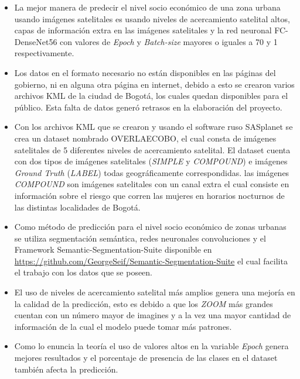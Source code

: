 \begin{itemize}
\item La mejor manera de predecir el nivel socio económico de una zona urbana usando imágenes satelitales es usando niveles de acercamiento satelital altos, capas de información extra en las imágenes satelitales y la red neuronal FC-DenseNet56 con valores de \textit{Epoch} y \textit{Batch-size} mayores o iguales a 70 y 1 respectivamente. 

\item Los datos en el formato necesario no están disponibles en las páginas del gobierno, ni en alguna otra página en internet, debido a esto se crearon varios archivos KML de la ciudad de Bogotá, los cuales quedan disponibles para el público. Esta falta de datos generó retrasos en la elaboración del proyecto. 

\item Con los archivos KML que se crearon y usando el software ruso SASplanet se crea un dataset nombrado OVERLAECOBO, el cual consta de imágenes satelitales de 5 diferentes niveles de acercamiento satelital. El dataset cuenta con dos tipos de imágenes satelitales (\textit{SIMPLE} y \textit{COMPOUND}) e imágenes \textit{Ground Truth} (\textit{LABEL}) todas geográficamente correspondidas. las imágenes \textit{COMPOUND} son imágenes satelitales con un canal extra el cual consiste en información sobre el riesgo que corren las mujeres en horarios nocturnos de las distintas localidades de Bogotá. 

\item Como método de predicción para el nivel socio económico de zonas urbanas se utiliza segmentación semántica, redes neuronales convoluciones y el Framework Semantic-Segmentation-Suite disponible en \url{https://github.com/GeorgeSeif/Semantic-Segmentation-Suite} el cual facilita el trabajo con los datos que se poseen. 

\item El uso de niveles de acercamiento satelital más amplios genera una mejoría en la calidad de la predicción, esto es debido a que los \textit{ZOOM} más grandes cuentan con un número mayor de imagines y a la vez una mayor cantidad de información de la cual el modelo puede tomar más patrones. 

\item Como lo enuncia la teoría el uso de valores altos en la variable \textit{Epoch} genera mejores resultados y el porcentaje de presencia de las clases en el dataset también afecta la predicción. 
\end{itemize}

